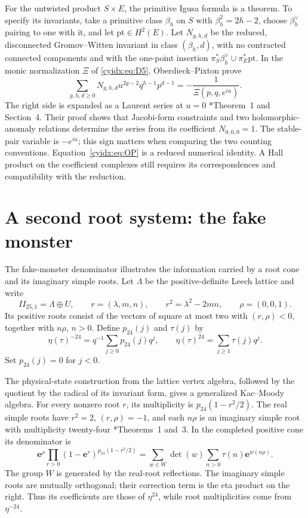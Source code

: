 For the untwisted product \(S\times E\), the primitive
Igusa formula is a theorem. To specify its invariants,
take a primitive class \(\beta_h\) on \(S\) with
\(\beta_h^2=2h-2\), choose \(\beta_h^\vee\) pairing
to one with it, and let \(\mathrm{pt}\in H^2(E)\).
Let \(N_{g,h,d}\) be the reduced, disconnected
Gromov--Witten invariant in class \((\beta_h,d)\),
with no contracted connected components and with the
one-point insertion
\(\pi_S^*\beta_h^\vee\cup\pi_E^*\mathrm{pt}\).
In the monic normalization \(\Xi\) of
\eqref{cyidx:eq:D5}, Oberdieck--Pixton prove
\begin{equation}\label{cyidx:eq:OP}
 \sum_{g,h,d\geq0}N_{g,h,d}
       u^{2g-2}q^{h-1}p^{d-1}
       =-\frac1{\Xi(p,q,e^{iu})}.
\end{equation}
The right side is expanded as a Laurent series at
\(u=0\) \cite{OP}*{Theorem~1 and Section~4}.
Their proof shows that Jacobi-form constraints and two
holomorphic-anomaly relations determine the series from
its coefficient \(N_{0,0,0}=1\). The stable-pair
variable is \(-e^{iu}\); this sign matters when comparing
the two counting conventions. Equation~\eqref{cyidx:eq:OP}
is a reduced numerical identity. A Hall product on the
coefficient complexes still requires its correspondences
and compatibility with the reduction.

\section{A second root system: the fake monster}
\label{cyidx:sec:fake}

The fake-monster denominator illustrates the information
carried by a root cone and its imaginary simple roots.
Let \(\Lambda\) be the positive-definite Leech lattice and
write
\[
 II_{25,1}=\Lambda\oplus U,\qquad
 r=(\lambda,m,n),\qquad r^2=\lambda^2-2mn,
 \qquad \rho=(0,0,1).
\]
Its positive roots consist of the vectors of square at most
two with \((r,\rho)<0\), together with \(n\rho\), \(n>0\).
Define \(p_{24}(j)\) and \(\tau(j)\) by
\[
 \eta(\tau)^{-24}=q^{-1}\sum_{j\geq0}p_{24}(j)q^j,
 \qquad \eta(\tau)^{24}=\sum_{j\geq1}\tau(j)q^j.
\]
Set \(p_{24}(j)=0\) for \(j<0\).

The physical-state construction from the lattice vertex
algebra, followed by the quotient by the radical of its
invariant form, gives a generalized Kac--Moody algebra.
For every nonzero root \(r\), its multiplicity is
\(p_{24}(1-r^2/2)\). The real simple roots have
\(r^2=2\), \((r,\rho)=-1\), and each \(n\rho\)
is an imaginary simple root with multiplicity twenty-four
\cite{BorcherdsFake1990}*{Theorems~1 and~3}.
In the completed positive cone its denominator is
\begin{equation}\label{cyidx:eq:fake-denominator}
 \mathbf e^\rho\prod_{r>0}
       (1-\mathbf e^r)^{p_{24}(1-r^2/2)}
  =\sum_{w\in W}\det(w)\sum_{n>0}\tau(n)\mathbf e^{w(n\rho)}.
\end{equation}
The group \(W\) is generated by the real-root reflections.
The imaginary simple roots are mutually orthogonal; their
correction term is the eta product on the right. Thus its
coefficients are those of \(\eta^{24}\), while root
multiplicities come from \(\eta^{-24}\).

